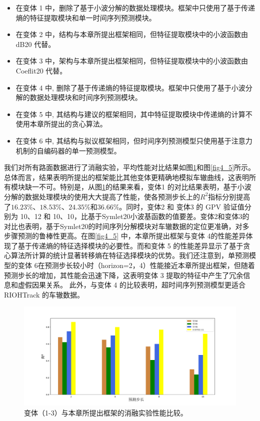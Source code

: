 \begin{itemize}
  \item  在变体 1 中，删除了基于小波分解的数据处理模块。框架中只使用了基于传递熵的特征提取模块和单一时间序列预测模块。
  \item  在变体 2 中，结构与本章所提出框架相同，但特征提取模块中的小波函数由 dB20 代替。
  \item  在变体 3 中，架构与本章所提出框架相同，但特征提取模块中的小波函数由 Coeflit20 代替。
  \item  在变体 4 中, 删除了基于传递熵的特征提取模块。框架中只使用了基于小波分解的数据处理模块和时间序列预测模块。
  \item  在变体 5 中, 其结构与建议的框架相同，其中特征提取模块中传递熵的计算不使用本章所提出的贪心算法。
  \item  在变体 6 中, 其结构与拟议框架相同，但时间序列预测模型只使用基于注意力机制的自编码器的单一预测模型。
\end{itemize}


我们对所有路面数据进行了消融实验，平均性能对比结果如图\ref{fig4_4}和图\ref{fig4_5}所示。总体而言，结果表明所提出的框架能比其他变体更精确地模拟车辙曲线，这表明所有模块缺一不可。特别是，从图\ref{fig4_4}的结果来看，变体1 的对比结果表明，基于小波分解的数据处理模块的使用大大提高了性能，使各预测步长上的$R^{2}$指标分别提高了$16.23\%$、$18.53\%$、$24.35\%$和$36.66\%$。同时，变体2 和 变体3 的 GPV 验证值分别为 10、12 和 10、10，比基于Symlet20小波基函数的值要差。变体2和变体3的对比也表明，基于Symlet20的时间序列分解模块对车辙数据的定位更准确，对多步骤预测的鲁棒性更高。在图\ref{fig4_5} 中，本章所提出框架与变体 4的性能差异体现了基于传递熵的特征选择模块的必要性。而和变体 5 的性能差异显示了基于贪心算法所计算的统计显著转移熵在特征选择模块的优势。我们还注意到，单预测模型的变体 6在预测步长较小时（horizon=2，4）性能接近本章所提出框架，但随着预测步长的增加，其性能会迅速下降，这表明变体 3 提取的特征中产生了冗余信息和虚假因果关系。 此外，与变体 4 的比较表明，超时间序列预测模型更适合 RIOHTrack 的车辙数据。

\begin{figure}[ht]
\begin{center}
\includegraphics[scale=0.26]{./ch4/fig4_5.pdf}
\caption{变体（1-3）与本章所提出框架的消融实验性能比较。} \label{fig4_4}
\end{center}
\end{figure}

